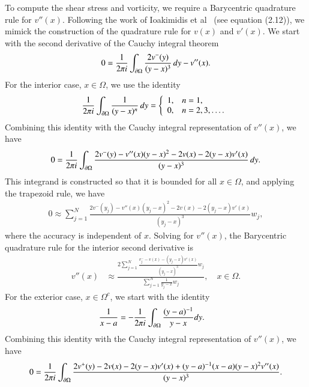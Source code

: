 \documentclass[preprint, 10pt]{elsarticle}
\begin{document}
To compute the shear stress and vorticity, we require a Barycentric
quadrature rule for $v''(x)$.  Following the work of Ioakimidis et
al~\cite{ioa-pap-per1991} (see equation (2.12)), we mimick the
construction of the quadrature rule for $v(x)$ and $v'(x)$. We start
with the second derivative of the Cauchy integral theorem
\begin{align}
  0 = \frac{1}{2\pi i} \int_{{\partial}\Omega} 
      \frac{2v^{-}(y)}{(y-x)^3}\,dy - v''(x).
\end{align}
For the interior case, $x \in \Omega$, we use the identity
\begin{align}
  \frac{1}{2\pi i}\int_{{\partial}\Omega} \frac{1}{(y-x)^n}\, dy = 
  \left\{
    \begin{array}{ll}
      1, & n = 1, \\
      0, & n = 2,3,\ldots. \\
    \end{array}
  \right.
\end{align}
Combining this identity with the Cauchy integral representation of
$v''(x)$, we have
\begin{align}
  0 = \frac{1}{2\pi i} \int_{{\partial}\Omega} 
      \frac{2v^{-}(y) - v''(x)(y-x)^2 - 2v(x) - 2(y-x)v'(x)}
      {(y-x)^3}\, dy.
\end{align}
This integrand is constructed so that it is bounded for all $x \in
\Omega$, and applying the trapezoid rule, we have
\begin{align}
  0 \approx  \sum_{j=1}^{N} 
      \frac{2v^{-}(y_j) - v''(x)(y_j-x)^2 - 2v(x) - 2(y_j-x)v'(x)}
      {(y_j-x)^3} w_j,
\end{align}
where the accuracy is independent of $x$.  Solving for $v''(x)$, the
Barycentric quadrature rule for the interior second derivative is
\begin{align}
  v''(x) &\approx \frac{2\sum\limits_{j=1}^N 
    \frac{v^{-}_{j} - v(x) - (y_j-x)v'(x)}{(y_j-x)^3}w_j}
    {\sum\limits_{j=1}^N \frac{1}{y_j-x}w_j}, \quad x \in \Omega.
\end{align}
For the exterior case, $x \in \Omega^c$, we start with the identity
\begin{align}
\frac{1}{x-a} &= -\frac{1}{2\pi i}\int_{{\partial}\Omega} 
    \frac{(y-a)^{-1}}{y-x} dy. 
\end{align}
Combining this identity with the Cauchy integral representation of
$v''(x)$, we have
\begin{align}
  0 = \frac{1}{2\pi i} \int_{{\partial}\Omega} 
    \frac{2v^+(y) - 2v(x) - 2(y-x)v'(x) + (y-a)^{-1} (x-a) (y-x)^2 v''(x)}
    {(y-x)^3}.
\end{align}
\end{document}
